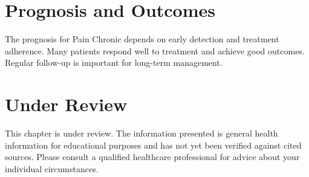 \section*{Prognosis and Outcomes}
The prognosis for Pain Chronic depends on early detection and treatment adherence. Many patients respond well to treatment and achieve good outcomes. Regular follow-up is important for long-term management.
\section*{Under Review}
This chapter is under review. The information presented is general health information for educational purposes and has not yet been verified against cited sources. Please consult a qualified healthcare professional for advice about your individual circumstances.


\clearpage
